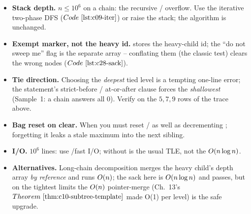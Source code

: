 \begin{hardeningbox}
\begin{itemize}[nosep,leftmargin=1.4em]
  \item \textbf{Stack depth.} \(n\le 10^6\) on a chain: the recursive
        / overflow. Use the iterative two-phase DFS
        (\(\coderef{c09-iter}\)) or raise the stack; the algorithm is unchanged.
  \item \textbf{Exempt marker, not the heavy id.}  stores the
        heavy-child id; the ``do not sweep me'' flag is the separate
         array -- conflating them (the classic
         test) clears the wrong nodes (\(\coderef{c28-sack}\)).
  \item \textbf{Tie direction.} Choosing the \emph{deepest} tied level is a
        tempting one-line error; the statement's strict-before / at-or-after
        clause forces the \emph{shallowest} (Sample~1: a chain answers all
        \(0\)). Verify on the \(5,7,9\) rows of the trace above.
  \item \textbf{Bag reset on clear.} When  you must reset
        / as well as decrementing ;
        forgetting it leaks a stale maximum into the next sibling.
  \item \textbf{I/O.} \(10^6\) lines: use /fast I/O; 
        without  is the usual TLE, not the
        \(O(n\log n)\).
  \item \textbf{Alternatives.} Long-chain decomposition merges the heavy child's
        depth array \emph{by reference} and runs \(O(n)\); the sack here is
        \(O(n\log n)\) and passes, but on the tightest limits the
        \(O(n)\) pointer-merge (Ch.~13's \(\thmref{c10-subtree-template}\)
        made O(1) per level) is the safe upgrade.
\end{itemize}
\end{hardeningbox}

